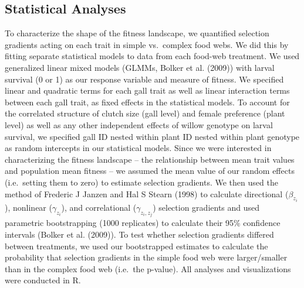\documentclass[]{elsarticle} %
\begin{document}
\subsection{Statistical Analyses}\label{statistical-analyses}

To characterize the shape of the fitness landscape, we quantified
selection gradients acting on each trait in simple vs.~complex food
webs. We did this by fitting separate statistical models to data from
each food-web treatment. We used generalized linear mixed models (GLMMs,
Bolker et al. (2009)) with larval survival (0 or 1) as our response
variable and measure of fitness. We specified linear and quadratic terms
for each gall trait as well as linear interaction terms between each
gall trait, as fixed effects in the statistical models. To account for
the correlated structure of clutch size (gall level) and female
preference (plant level) as well as any other independent effects of
willow genotype on larval survival, we specified gall ID nested within
plant ID nested within plant genotype as random intercepts in our
statistical models. Since we were interested in characterizing the
fitness landscape -- the relationship between mean trait values and
population mean fitness -- we assumed the mean value of our random
effects (i.e.~setting them to zero) to estimate selection gradients. We
then used the method of Frederic J Janzen and Hal S Stearn (1998) to
calculate directional (\(\beta_{z_i}\)), nonlinear (\(\gamma_{z_i}\)),
and correlational (\(\gamma_{z_i,z_j}\)) selection gradients and used
parametric bootstrapping (1000 replicates) to calculate their 95\%
confidence intervals (Bolker et al. (2009)). To test whether selection
gradients differed between treatments, we used our bootstrapped
estimates to calculate the probability that selection gradients in the
simple food web were larger/smaller than in the complex food web
(i.e.~the p-value). All analyses and visualizations were conducted in R.
\end{document}
